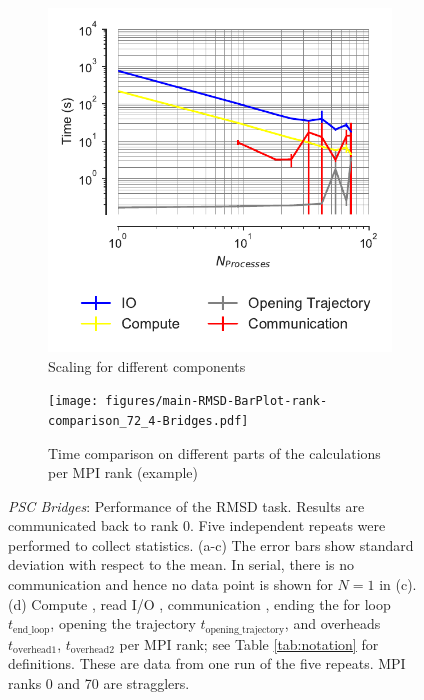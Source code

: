 \begin{figure}[!htb]
  \begin{subfigure}{.45\textwidth}
    \includegraphics[width=\linewidth]{figures/main-RMSD-time_comp_IO_comparison-Bridges.pdf}
    \captionsetup{format=hang}
    \caption{Scaling for different components}
    \label{fig:ScalingComputeIO-Bridges}
  \end{subfigure}
  \hfill
  \begin{subfigure} {.5\textwidth}
    \texttt{[image: figures/main-RMSD-BarPlot-rank-comparison\_72\_4-Bridges.pdf]}
    \captionsetup{format=hang}
    \caption{Time comparison on different parts of the calculations per MPI rank (example)}
    \label{fig:MPIranks-Bridges}
  \end{subfigure}
  \caption{\emph{PSC Bridges}: Performance of the RMSD task.
    Results are communicated back to rank 0.
    Five independent repeats were performed to collect statistics.
    (a-c) The error bars show standard deviation with respect to the mean.
    In serial, there is no communication and hence no data point is shown for $N=1$ in (c).
    (d) Compute \tcomp, read I/O \tIO, communication \tcomm, ending the for loop $t_{\text{end\_loop}}$, opening the trajectory $t_{\text{opening\_trajectory}}$, and overheads $t_{\text{overhead1}}$, $t_{\text{overhead2}}$ per MPI rank; see Table \ref{tab:notation} for definitions.
    These are data from one run of the five repeats.
    MPI ranks 0 and 70 are stragglers.
  }
\label{fig:MPIwithIO-Bridges}
\end{figure} 



